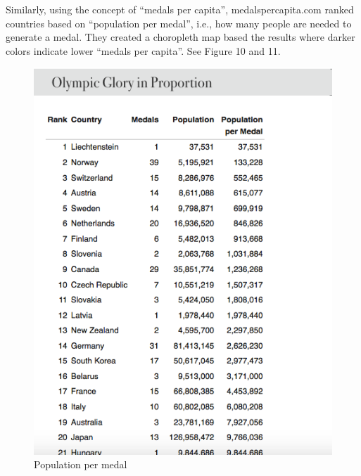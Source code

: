 \documentclass[12pt]{article}
\begin{document}
Similarly, using the concept of “medals per capita”, medalspercapita.com ranked countries based on “population per medal”, i.e., how many people are needed to generate a medal. They created a choropleth map based the results where darker colors indicate lower “medals per capita”. See Figure 10 and 11. 

\begin{figure}[!b]
  \begin{minipage}[b]{0.45\textwidth}
  \centering
    \includegraphics[scale=0.29]{pics/3-5.png}
    \caption{\footnotesize Population per medal}
    \label{fig:1}
  \end{minipage}
  \hfill
  \begin{minipage}[b]{0.45\textwidth}
  \centering

\end{minipage}
\end{figure}
\end{document}
